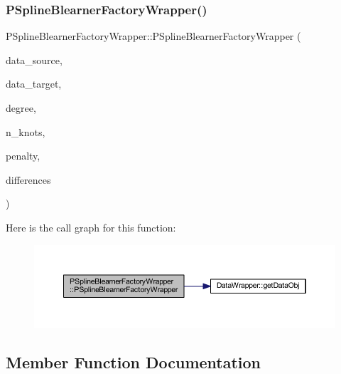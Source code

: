 \subsubsection{\texorpdfstring{P\+Spline\+Blearner\+Factory\+Wrapper()}{PSplineBlearnerFactoryWrapper()}}
{\footnotesize\ttfamily P\+Spline\+Blearner\+Factory\+Wrapper\+::\+P\+Spline\+Blearner\+Factory\+Wrapper (\begin{DoxyParamCaption}\item[{\mbox{\hyperlink{class_data_wrapper}{Data\+Wrapper}} \&}]{data\+\_\+source,  }\item[{\mbox{\hyperlink{class_data_wrapper}{Data\+Wrapper}} \&}]{data\+\_\+target,  }\item[{const unsigned int \&}]{degree,  }\item[{const unsigned int \&}]{n\+\_\+knots,  }\item[{const double \&}]{penalty,  }\item[{const unsigned int \&}]{differences }\end{DoxyParamCaption})\hspace{0.3cm}{\ttfamily [inline]}}

Here is the call graph for this function\+:
\nopagebreak
\begin{figure}[H]
\begin{center}
\leavevmode
\includegraphics[width=350pt]{class_p_spline_blearner_factory_wrapper_a3ff597f06068aa467bd6646d267fb861_cgraph}
\end{center}
\end{figure}


\subsection{Member Function Documentation}
\mbox{\label{class_p_spline_blearner_factory_wrapper_a13ca216f7c9673bb66598c9be0e44b03}} 
